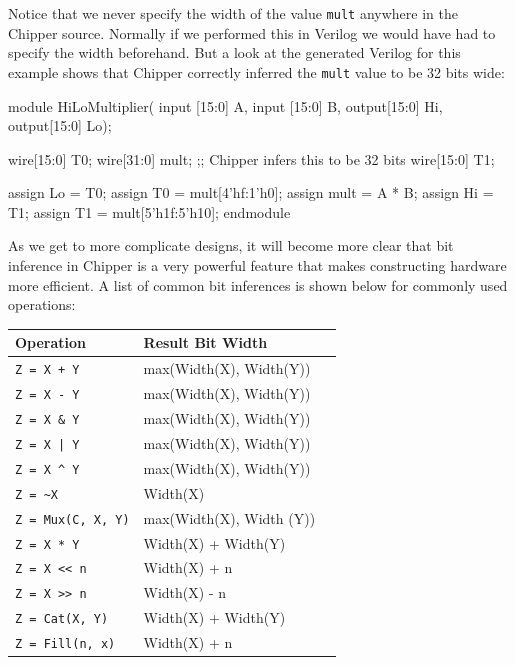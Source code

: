 Notice that we never specify the width of the value \verb+mult+ anywhere in the Chipper source. Normally if we performed this in Verilog we would have had to specify the width beforehand. But a look at the generated Verilog for this example shows that Chipper correctly inferred the \verb+mult+ value to be 32 bits wide:

\begin{stanza}
module HiLoMultiplier(
    input [15:0] A,
    input [15:0] B,
    output[15:0] Hi,
    output[15:0] Lo);

  wire[15:0] T0;
  wire[31:0] mult; ;; Chipper infers this to be 32 bits
  wire[15:0] T1;

  assign Lo = T0;
  assign T0 = mult[4'hf:1'h0];
  assign mult = A * B;
  assign Hi = T1;
  assign T1 = mult[5'h1f:5'h10];
endmodule

\end{stanza}

As we get to more complicate designs, it will become more clear that bit inference in Chipper is a very powerful feature that makes constructing hardware more efficient. A list of common bit inferences is shown below for commonly used operations:

\begin{center}
\begin{tabular}{| l | l | l | }
\hline
{\bf Operation} & {\bf Result Bit Width} \\ \hline
\verb!Z = X + Y! & max(Width(X), Width(Y))  \\ \hline
\verb+Z = X - Y+ & max(Width(X), Width(Y)) \\ \hline
\verb+Z = X & Y+ & max(Width(X), Width(Y)) \\ \hline
\verb+Z = X | Y+ & max(Width(X), Width(Y)) \\ \hline
\verb+Z = X ^ Y+ & max(Width(X), Width(Y)) \\ \hline
\verb+Z = ~X+ & Width(X) \\ \hline
\verb+Z = Mux(C, X, Y)+ & max(Width(X), Width (Y)) \\ \hline
\verb+Z = X * Y+ & Width(X) + Width(Y) \\ \hline
\verb+Z = X << n+ & Width(X) + n \\ \hline
\verb+Z = X >> n+ & Width(X) - n \\ \hline
\verb+Z = Cat(X, Y)+ & Width(X) + Width(Y) \\ \hline
\verb+Z = Fill(n, x)+ & Width(X) + n \\ \hline
\end{tabular}
\end{center}

